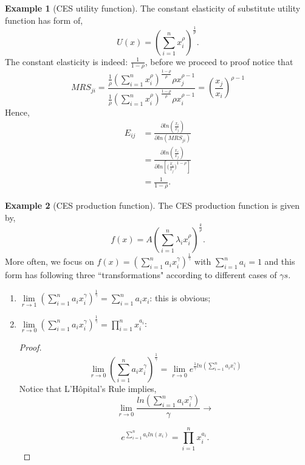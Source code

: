\documentclass[12pt, a4paper]{article}
\theoremstyle{definition}
\newtheorem{example}{Example}
\newcommand{\summation}[2]{\sum\limits_{#1}^{#2}}
\newcommand{\limit}[2]{\lim\limits_{#1\to #2}}
\begin{document}
\begin{example}[CES utility function]
The constant elasticity of substitute utility function has form of,
\[
U(x) = (\summation{i=1}{n} x_i^{\rho})^{\frac{1}{\rho}}.
\]
The constant elasticity is indeed: $\frac{1}{1-\rho}$, before we proceed to proof notice that 
\[
MRS_{ji} = \frac{\frac{1}{\rho}(\sum\limits_{i=1}^n x_i^{\rho})^{\frac{1-\rho}{\rho}}\rho x_j^{\rho-1}}{\frac{1}{\rho}(\sum\limits_{i=1}^n x_i^{\rho})^{\frac{1-\rho}{\rho}}\rho x_i^{\rho-1}}=(\frac{x_j}{x_i})^{\rho -1}
\]
Hence,
\begin{align*}
E_{ij} &= \frac{\partial ln(\frac{x_i}{x_j})}{\partial ln(MRS_{ji})}\\
&=\frac{\partial ln(\frac{x_i}{x_j})}{\partial ln[({\frac{x_i}{x_j})}^{1-\rho}]}\\
&=\frac{1}{1-\rho}.
\end{align*}
\end{example}

\begin{example}[CES production function]
The CES production function is given by, 
\[
f(x)=A(\summation{i=1}{n}\lambda_ix_i^{\rho})^{\frac{k}{\rho}}.
\]
More often, we focus on $f(x)=(\summation{i=1}{n}a_ix_i^{\gamma})^{\frac{1}{\gamma}}$ with $\summation{i=1}{n}a_i=1$ and this form has following three ``transformations" according to different cases of $\gamma s$.
\begin{enumerate}
\item $\limit{r}{1}(\summation{i=1}{n}a_ix_i^{\gamma})^{\frac{1}{\gamma}} = \summation{i=1}{n}a_ix_i$: this is obvious;
\item $\limit{r}{0} (\summation{i=1}{n}a_ix_i^{\gamma})^{\frac{1}{\gamma}} = \prod\limits_{i=1}^n x_i^{a_i}$: 
\begin{proof}
\[
\limit{r}{0} (\summation{i=1}{n}a_ix_i^{\gamma})^{\frac{1}{\gamma}}= \limit{r}{0}e^{\frac{1}{\gamma}ln(\sum\limits_{i=1}^n a_ix_i^{\gamma})}
\]
Notice that L'H\^opital's Rule implies,
\[
\limit{r}{0}\frac{ln(\summation{i=1}{n}a_ix_i^{\gamma})}{\gamma}\to
\]

\[
e^{\summation{i=1}{n}a_iln(x_i)}=\prod\limits_{i=1}^nx_i^{a_i}.
\]
\end{proof}
\end{enumerate}
\end{example}
\end{document}
